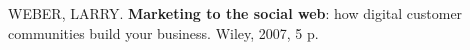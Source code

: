 \begin{thebibliography}{99}

 

    WEBER, LARRY.
    \textbf{Marketing to the social web}: how digital customer communities build your business.
    Wiley, 2007, 5 p.

\end{thebibliography}
